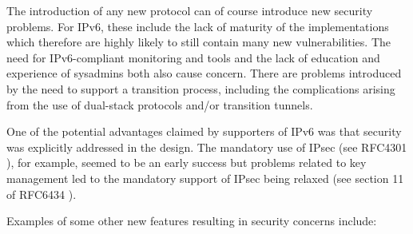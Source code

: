 


The introduction of any new protocol can of course introduce new security problems. For IPv6, these include the lack of maturity of the implementations which therefore are highly likely to still contain many new vulnerabilities. The need for IPv6-compliant monitoring and tools and the lack of education and experience of sysadmins both also cause concern. There are problems introduced by the need to support a transition process, including the complications arising from the use of dual-stack protocols and/or transition tunnels.

One of the potential advantages claimed by supporters of IPv6 was that security was explicitly addressed in the design. The mandatory use of IPsec (see RFC4301 \cite{rfc}), for example, seemed to be an early success but problems related to key management led to the mandatory support of IPsec being relaxed (see section 11 of RFC6434 \cite{rfc}). 


Examples of some other new features resulting in security concerns include:

